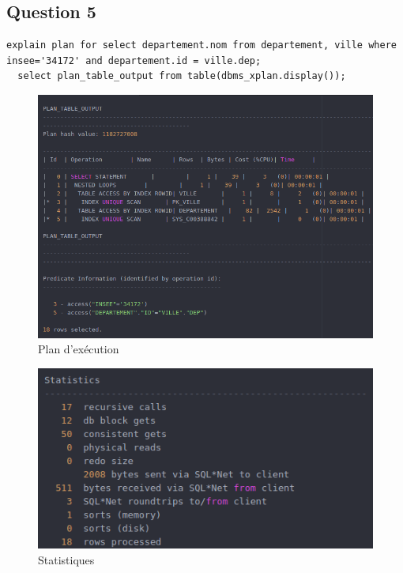 \documentclass[a4paper,12pt]{article}
\begin{document}
\subsection{Question 5}
\begin{lstlisting}[caption={requêtes permettant d'expliquer le plan d'exécution affichant le nom du département pour la ville dont le numéro insee est 34172}, label={lst:question_5}]
  explain plan for select departement.nom from departement, ville where insee='34172' and departement.id = ville.dep;
  select plan_table_output from table(dbms_xplan.display());
\end{lstlisting}

\begin{figure}[!ht]
  \centering
  \includegraphics[scale=0.6]{images/q5_1.png}
  \caption{Plan d'exécution}
\end{figure}

\begin{figure}[!ht]
  \centering
  \includegraphics[scale=0.6]{images/q5_2.png}
  \caption{Statistiques}
\end{figure}
\end{document}
